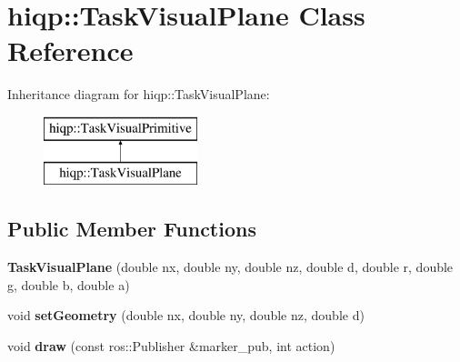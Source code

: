 \hypertarget{classhiqp_1_1TaskVisualPlane}{\section{hiqp\-:\-:Task\-Visual\-Plane Class Reference}
\label{classhiqp_1_1TaskVisualPlane}
}
Inheritance diagram for hiqp\-:\-:Task\-Visual\-Plane\-:\begin{figure}[H]
\begin{center}
\leavevmode
\includegraphics[height=2.000000cm]{classhiqp_1_1TaskVisualPlane}
\end{center}
\end{figure}
\subsection*{Public Member Functions}
\begin{DoxyCompactItemize}
\item 
\hypertarget{classhiqp_1_1TaskVisualPlane_a3c6cb31fd14a744949076f178533fd7b}{{\bfseries Task\-Visual\-Plane} (double nx, double ny, double nz, double d, double r, double g, double b, double a)}\label{classhiqp_1_1TaskVisualPlane_a3c6cb31fd14a744949076f178533fd7b}

\item 
\hypertarget{classhiqp_1_1TaskVisualPlane_aea03efd3dfaadc210644bdcae5437f7a}{void {\bfseries set\-Geometry} (double nx, double ny, double nz, double d)}\label{classhiqp_1_1TaskVisualPlane_aea03efd3dfaadc210644bdcae5437f7a}

\item 
\hypertarget{classhiqp_1_1TaskVisualPlane_a19969b5e40d92e0991f0d8997ce9550f}{void {\bfseries draw} (const ros\-::\-Publisher \&marker\-\_\-pub, int action)}\label{classhiqp_1_1TaskVisualPlane_a19969b5e40d92e0991f0d8997ce9550f}

\end{DoxyCompactItemize}
